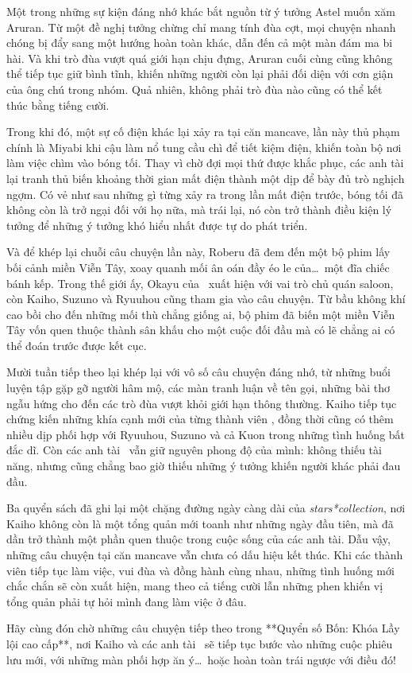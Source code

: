 \documentclass[main.tex]{subfiles}
\begin{document}
Một trong những sự kiện đáng nhớ khác bắt nguồn từ ý tưởng Astel muốn xăm Aruran. Từ một đề nghị tưởng chừng chỉ mang tính đùa cợt, mọi chuyện nhanh chóng bị đẩy sang một hướng hoàn toàn khác, dẫn đến cả một màn đám ma bi hài. Và khi trò đùa vượt quá giới hạn chịu đựng, Aruran cuối cùng cũng không thể tiếp tục giữ bình tĩnh, khiến những người còn lại phải đối diện với cơn giận của ông chú trong nhóm. Quả nhiên, không phải trò đùa nào cũng có thể kết thúc bằng tiếng cười.

Trong khi đó, một sự cố điện khác lại xảy ra tại căn mancave, lần này thủ phạm chính là Miyabi khi cậu làm nổ tung cầu chì để tiết kiệm điện, khiến toàn bộ nơi làm việc chìm vào bóng tối. Thay vì chờ đợi mọi thứ được khắc phục, các anh tài lại tranh thủ biến khoảng thời gian mất điện thành một dịp để bày đủ trò nghịch ngợm. Có vẻ như sau những gì từng xảy ra trong lần mất điện trước, bóng tối đã không còn là trở ngại đối với họ nữa, mà trái lại, nó còn trở thành điều kiện lý tưởng để những ý tưởng khó hiểu nhất được tự do phát triển.

Và để khép lại chuỗi câu chuyện lần này, Roberu đã đem đến một bộ phim lấy bối cảnh miền Viễn Tây, xoay quanh mối ân oán đầy éo le của\dots\ một đĩa chiếc bánh kếp. Trong thế giới ấy, Okayu của \hll\ xuất hiện với vai trò chủ quán saloon, còn Kaiho, Suzuno và Ryuuhou cũng tham gia vào câu chuyện. Từ bầu không khí cao bồi cho đến những mối thù chẳng giống ai, bộ phim đã biến một miền Viễn Tây vốn quen thuộc thành sân khấu cho một cuộc đối đầu mà có lẽ chẳng ai có thể đoán trước được kết cục.

Mười tuần tiếp theo lại khép lại với vô số câu chuyện đáng nhớ, từ những buổi luyện tập gặp gỡ người hâm mộ, các màn tranh luận về tên gọi, những bài thơ ngẫu hứng cho đến các trò đùa vượt khỏi giới hạn thông thường. Kaiho tiếp tục chứng kiến những khía cạnh mới của từng thành viên \hls, đồng thời cũng có thêm nhiều dịp phối hợp với Ryuuhou, Suzuno và cả Kuon trong những tình huống bất đắc dĩ. Còn các anh tài \hls\ vẫn giữ nguyên phong độ của mình: không thiếu tài năng, nhưng cũng chẳng bao giờ thiếu những ý tưởng khiến người khác phải đau đầu.

Ba quyển sách đã ghi lại một chặng đường ngày càng dài của \textit{stars*collection}, nơi Kaiho không còn là một tổng quản mới toanh như những ngày đầu tiên, mà đã dần trở thành một phần quen thuộc trong cuộc sống của các anh tài. Dẫu vậy, những câu chuyện tại căn mancave vẫn chưa có dấu hiệu kết thúc. Khi các thành viên tiếp tục làm việc, vui đùa và đồng hành cùng nhau, những tình huống mới chắc chắn sẽ còn xuất hiện, mang theo cả tiếng cười lẫn những phen khiến vị tổng quản phải tự hỏi mình đang làm việc ở đâu.

Hãy cùng đón chờ những câu chuyện tiếp theo trong **Quyển số Bốn: Khóa Lầy lội cao cấp**, nơi Kaiho và các anh tài \hls\ sẽ tiếp tục bước vào những cuộc phiêu lưu mới, với những màn phối hợp ăn ý\dots\ hoặc hoàn toàn trái ngược với điều đó!
\end{document}
